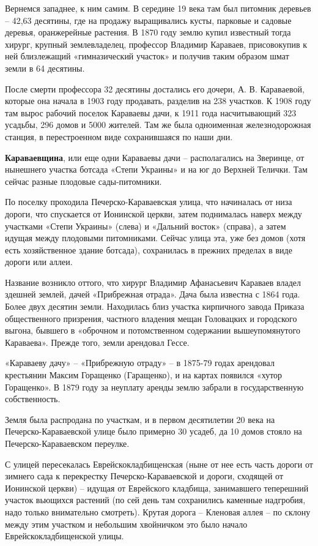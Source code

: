 Вернемся западнее, к ним самим. В середине 19 века там был питомник деревьев – 42,63 десятины, где на продажу выращивались кусты, парковые и садовые деревья, оранжерейные растения. В 1870 году землю купил известный тогда хирург, крупный землевладелец, профессор Владимир Караваев, присовокупив к ней близлежащий «гимназический участок» и получив таким образом шмат земли в 64 десятины. 

После смерти профессора 32 десятины достались его дочери, А. В. Караваевой, которые она начала в 1903 году продавать, разделив на 238 участков. К 1908 году там вырос рабочий поселок Караваевы дачи, к 1911 года насчитывающий 323 усадьбы, 296 домов и 5000 жителей. Там же была одноименная железнодорожная станция, в перестроенном виде сохранившаяся по наши дни.\\ 

\medskip


\textbf{Караваевщина}, или еще одни Караваевы дачи – располагались на Зверинце, от нынешнего участка ботсада «Степи Украины» и на юг до Верхней Телички. Там сейчас разные плодовые сады-питомники. 

По поселку проходила Печерско-Караваевс\-кая улица, что начиналась от низа дороги, что спускается от Ионинской церкви, затем поднималась наверх между участками «Степи Украины» (слева) и «Дальний восток» (справа), а затем идущая между плодовыми питомниками. Сейчас улица эта, уже без домов (хотя есть хозяйственное здание ботсада), сохранилась в прежних пределах в виде дороги или аллеи.

Название возникло оттого, что хирург Владимир Афанасьевич Караваев владел здешней землей, дачей «Прибрежная отрада». Дача была известна с 1864 года. Более двух десятин земли. Находилась близ участка кирпичного завода Приказа общественного призрения, частного владения мещан Головацких и городского выгона, бывшего в «оброчном и потомственном содержании вышеупомянутого Караваева». Прежде того, земли арендовал Гессе.
 
«Караваеву дачу» – «Прибрежную отраду» – в 1875-79 годах арендовал крестьянин Максим Горащенко (Гаращенко), и на картах появился «хутор Горащенко». В 1879 году за неуплату аренды землю забрали в государственную собственность.

Земля была распродана по участкам, и в первом десятилетии 20 века на Печерско-Караваевской улице было примерно 30 усадеб, да 10 домов стояло на Печерско-Карава\-евском переулке.

С улицей пересекалась Еврейскокладбищенская (ныне от нее есть часть дороги от зимнего сада к перекрестку Печерско-Караваевской и дороги, сходящей от Ионинской церкви) – идущая от Еврейского кладбища, занимавшего теперешний участок вьющихся растений (по сей день там сохранились каменные надгробия, надо только внимательно смотреть). Крутая дорога – Кленовая аллея – по склону между этим участком и небольшим хвойничком это было начало Еврейскокладбищенской улицы.\\

